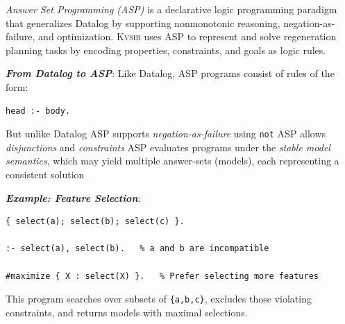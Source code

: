 \documentclass[noacm,sigplan,review]{acmart}
\newcommand{\sys}{{\scshape Kv{\textalpha}sir}\xspace}
\newcommand{\heading}[1]{\vspace{2pt}\noindent\textbf{\emph{#1}}:\enspace}
\begin{document}
\emph{Answer Set Programming (ASP)} is a declarative logic programming paradigm
that generalizes Datalog by supporting nonmonotonic reasoning,
negation-as-failure, and optimization. \sys uses ASP to represent and solve
regeneration planning tasks by encoding properties, constraints, and goals as
logic rules.

\heading{From Datalog to ASP}
Like Datalog, ASP programs consist of rules of the form:
\begin{verbatim}
head :- body.
\end{verbatim}

But unlike Datalog
ASP supports \emph{negation-as-failure} using \texttt{not}
ASP allows \emph{disjunctions} and \emph{constraints}
ASP evaluates programs under the \emph{stable model semantics}, which may yield
multiple answer-sets (models), each representing a consistent solution

\heading{Example: Feature Selection}
\begin{verbatim}
{ select(a); select(b); select(c) }.

:- select(a), select(b).   % a and b are incompatible

#maximize { X : select(X) }.   % Prefer selecting more features
\end{verbatim}

This program searches over subsets of \texttt{\{a,b,c\}}, excludes those
violating constraints, and returns models with maximal selections.
\end{document}
